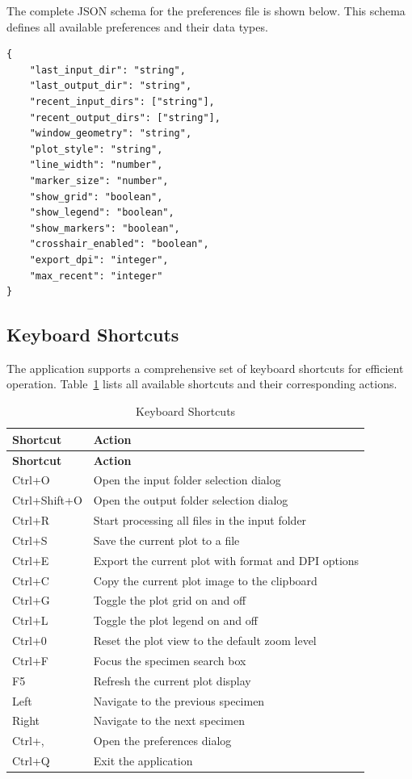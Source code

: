 \documentclass[11pt,a4paper]{article}
\begin{document}
The complete JSON schema for the preferences file is shown below. This schema defines all available preferences and their data types.

\begin{lstlisting}
{
    "last_input_dir": "string",
    "last_output_dir": "string",
    "recent_input_dirs": ["string"],
    "recent_output_dirs": ["string"],
    "window_geometry": "string",
    "plot_style": "string",
    "line_width": "number",
    "marker_size": "number",
    "show_grid": "boolean",
    "show_legend": "boolean",
    "show_markers": "boolean",
    "crosshair_enabled": "boolean",
    "export_dpi": "integer",
    "max_recent": "integer"
}
\end{lstlisting}

\subsection{Keyboard Shortcuts}

The application supports a comprehensive set of keyboard shortcuts for efficient operation. Table~\ref{tab:shortcuts} lists all available shortcuts and their corresponding actions.

\begin{longtable}{p{4cm}p{10cm}}
\caption{Keyboard Shortcuts}\label{tab:shortcuts}\\
\toprule
\textbf{Shortcut} & \textbf{Action} \\
\midrule
\endfirsthead
\toprule
\textbf{Shortcut} & \textbf{Action} \\
\midrule
\endhead
Ctrl+O & Open the input folder selection dialog \\
Ctrl+Shift+O & Open the output folder selection dialog \\
Ctrl+R & Start processing all files in the input folder \\
Ctrl+S & Save the current plot to a file \\
Ctrl+E & Export the current plot with format and DPI options \\
Ctrl+C & Copy the current plot image to the clipboard \\
Ctrl+G & Toggle the plot grid on and off \\
Ctrl+L & Toggle the plot legend on and off \\
Ctrl+0 & Reset the plot view to the default zoom level \\
Ctrl+F & Focus the specimen search box \\
F5 & Refresh the current plot display \\
Left & Navigate to the previous specimen \\
Right & Navigate to the next specimen \\
Ctrl+, & Open the preferences dialog \\
Ctrl+Q & Exit the application \\
\bottomrule
\end{longtable}
\end{document}
